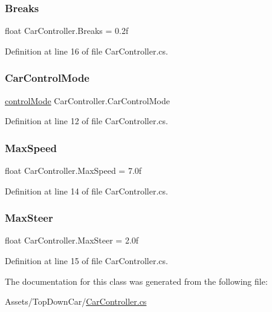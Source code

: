 \subsubsection{\texorpdfstring{Breaks}{Breaks}}
{\footnotesize\ttfamily float Car\+Controller.\+Breaks = 0.\+2f}



Definition at line 16 of file Car\+Controller.\+cs.

\mbox{\label{class_car_controller_a7e06bdbe46752de57aef027acbcb35c3}} 
\subsubsection{\texorpdfstring{Car\+Control\+Mode}{CarControlMode}}
{\footnotesize\ttfamily \hyperlink{_car_controller_8cs_ad8446c4cd09d94d260f08801d2bef7d2}{control\+Mode} Car\+Controller.\+Car\+Control\+Mode}



Definition at line 12 of file Car\+Controller.\+cs.

\mbox{\label{class_car_controller_a78ebb73a01931195a4b691f230bc25c1}} 
\subsubsection{\texorpdfstring{Max\+Speed}{MaxSpeed}}
{\footnotesize\ttfamily float Car\+Controller.\+Max\+Speed = 7.\+0f}



Definition at line 14 of file Car\+Controller.\+cs.

\mbox{\label{class_car_controller_a465c8a231382156d7c5a9593f97b9900}} 
\subsubsection{\texorpdfstring{Max\+Steer}{MaxSteer}}
{\footnotesize\ttfamily float Car\+Controller.\+Max\+Steer = 2.\+0f}



Definition at line 15 of file Car\+Controller.\+cs.



The documentation for this class was generated from the following file\+:\begin{DoxyCompactItemize}
\item 
Assets/\+Top\+Down\+Car/\hyperlink{_car_controller_8cs}{Car\+Controller.\+cs}\end{DoxyCompactItemize}
